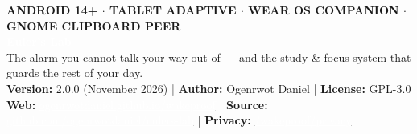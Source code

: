 \documentclass[11pt,a4paper]{article}
\begin{document}
\color{wpink}

\thispagestyle{empty}
\begin{heroheader}
  {\sffamily\scriptsize\bfseries\textcolor{wpteal}{ANDROID 14+ $\cdot$ TABLET ADAPTIVE $\cdot$ WEAR OS COMPANION $\cdot$ GNOME CLIPBOARD PEER}}\\[6pt]
  {\sffamily\Huge\bfseries\textcolor{white}{Euler's Lab}}\\[4pt]
  {\sffamily\large\textcolor{white!92}{The alarm you cannot talk your way out of --- and the study \& focus system that guards the rest of your day.}}\\[10pt]
  {\sffamily\small\textcolor{white!80}{%
    \textbf{Version:} 2.0.0 (November 2026) \quad|\quad
    \textbf{Author:} Ogenrwot Daniel \quad|\quad
    \textbf{License:} GPL-3.0\\[3pt]
    \textbf{Web:} \href{https://ogenrwotdaniel.github.io/wakeproof/}{\textcolor{white}{\underline{ogenrwotdaniel.github.io/wakeproof}}} \quad|\quad
    \textbf{Source:} \href{https://github.com/ogenrwotdaniel/eulers-lab}{\textcolor{white}{\underline{github.com/ogenrwotdaniel/eulers-lab}}} \quad|\quad
    \textbf{Privacy:} \href{https://ogenrwotdaniel.github.io/wakeproof/privacy/}{\textcolor{white}{\underline{/wakeproof/privacy}}}%
  }}
\end{heroheader}

\vspace{6pt}
\end{document}
